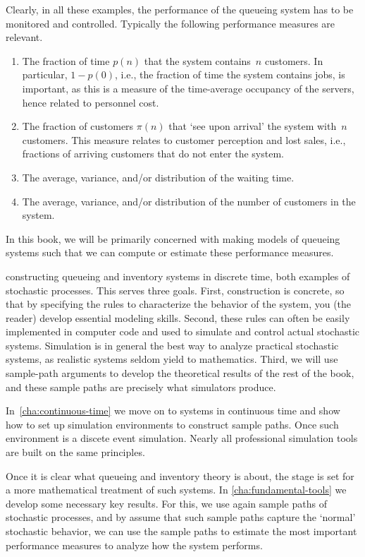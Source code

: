 \documentclass[queueing-book.tex]{subfiles}
\begin{document}
Clearly, in all these examples, the performance of the queueing system has to be monitored and controlled.
Typically the following performance measures are relevant.
\begin{enumerate}
\item The fraction of time $p(n)$ that the system contains~$n$ customers.
 In particular, $1-p(0)$, i.e., the fraction of time the system contains jobs, is important, as this is a measure of the time-average occupancy of the servers, hence related to personnel cost.
\item The fraction of customers $\pi(n)$ that `see upon arrival' the system with~$n$ customers.
  This measure relates to customer perception and lost sales, i.e., fractions of arriving customers that do not enter the system.
\item The average, variance, and/or distribution of the waiting time.
\item The average, variance, and/or distribution of the number of customers in the system.\
\end{enumerate}
In this book, we will be primarily concerned with making models of queueing systems such that we can compute or estimate these performance measures.

 constructing queueing and inventory systems in discrete time, both examples of stochastic processes.
This serves three goals.
First, construction is concrete, so that by specifying the rules to characterize the behavior of the system, you (the reader) develop essential modeling skills.
Second, these rules can often be easily implemented in computer code and used to simulate and control actual stochastic systems.
Simulation is in general the best way to analyze practical stochastic systems, as realistic systems seldom yield to mathematics.
Third, we will use sample-path arguments to develop the theoretical results of the rest of the book, and these sample paths are precisely what simulators produce.

In~\cref{cha:continuous-time} we move on to systems in continuous time and show how to set up simulation environments to construct sample paths. Once such environment is a discete event simulation. Nearly all professional simulation tools are built on the same principles.

Once it is clear what queueing and inventory theory is about, the stage is set for a more mathematical treatment of such systems.
In \cref{cha:fundamental-tools} we develop some necessary key results.
For this, we use again sample paths of stochastic processes, and by assume that such sample paths capture the `normal' stochastic behavior, we can use the sample paths to estimate the  most important performance measures to analyze how the system performs.
\end{document}

